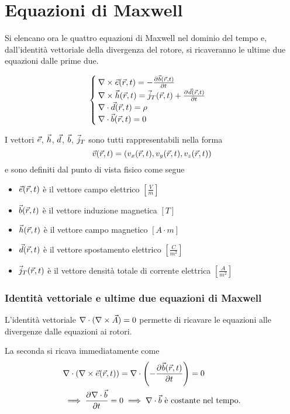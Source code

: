 \section{Equazioni di Maxwell}
Si elencano ora le quattro equazioni di Maxwell nel dominio del tempo e, dall'identità
vettoriale della divergenza del rotore, si ricaveranno le ultime due equazioni dalle prime due.

\begin{equation}\begin{cases}
  \nabla\times \vec{e}(\vec{r},t) = -\frac{\partial^{} {\vec{b}(\vec{r},t)}}{\partial {t}^{}} \\
  \nabla\times \vec{h}(\vec{r},t) = \vec{j}_T(\vec{r},t) + \frac{\partial^{} {\vec{d}(\vec{r},t)}}{\partial {t}^{}} \\
  \nabla\cdot \vec{d}(\vec{r},t) = \rho \\
  \nabla\cdot \vec{b}(\vec{r},t) = 0
\end{cases}\label{eq:maxwell}\end{equation}

I vettori $\vec{e}$, $\vec{h}$, $\vec{d}$, $\vec{b}$, $\vec{j}_T$ sono tutti rappresentabili nella forma
$$\vec{v}(\vec{r},t) = \left(v_x(\vec{r},t), v_y(\vec{r},t), v_z(\vec{r},t)\right)$$
e sono definiti dal punto di vista fisico come segue
\begin{itemize}
  \item $\vec{e}(\vec{r},t)$ è il vettore campo elettrico $\left[\frac{V}{m}\right]$
  \item $\vec{b}(\vec{r},t)$ è il vettore induzione magnetica $[T]$
  \item $\vec{h}(\vec{r},t)$ è il vettore campo magnetico $[A \cdot m]$
  \item $\vec{d}(\vec{r},t)$ è il vettore spostamento elettrico $\left[\frac{C}{m^2}\right]$
  \item $\vec{j}_T(\vec{r}, t)$ è il vettore densità totale di corrente elettrica $\left[\frac{A}{m^2}\right]$
\end{itemize}

\subsubsection{Identità vettoriale e ultime due equazioni di Maxwell} \label{sec:id-not}
L'identità vettoriale $\nabla\cdot (\nabla\times \vec{A}) = 0$ permette di ricavare
le equazioni alle divergenze dalle equazioni ai rotori.

La seconda si ricava immediatamente come
\begin{equation}\begin{split}
  & \nabla\cdot (\nabla\times \vec{e}(\vec{r},t)) = \nabla\cdot \left(-\frac{\partial^{} {\vec{b}(\vec{r},t)}}{\partial {t}^{}}\right)=0 \\
	& \implies \frac{\partial^{} {\nabla\cdot \vec{b}}}{\partial {t}^{}}=0 \implies \nabla\cdot \vec{b} \text{ è costante nel tempo.}\\
\end{split}\end{equation}


